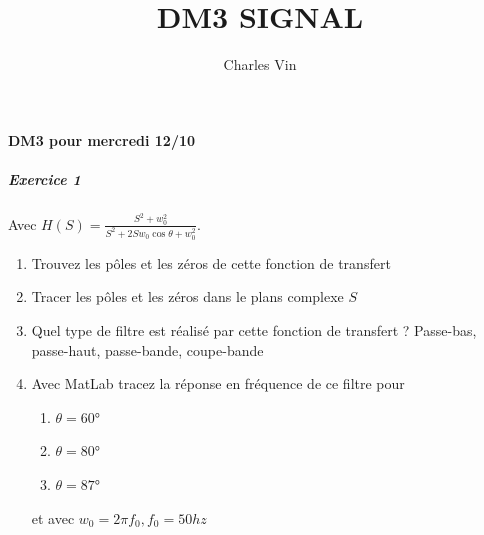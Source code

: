 \documentclass{article}
\title{DM3 SIGNAL}
\author{Charles Vin}
\theoremstyle{plain}%
\theoremstyle{definition}
\theoremstyle{remark}
\begin{document}
\maketitle

\paragraph*{DM3 pour mercredi 12/10}
\subparagraph*{Exercice 1}
Avec $ H(S) = \frac{S^2 + w_0^2}{S^2 + 2Sw_0 \cos \theta + w_0^2} $. \begin{enumerate}
    \item Trouvez les pôles et les zéros de cette fonction de transfert
    \item Tracer les pôles et les zéros dans le plans complexe $ S $ 
    \item Quel type de filtre est réalisé par cette fonction de transfert ? Passe-bas, passe-haut, passe-bande, coupe-bande
    \item Avec MatLab tracez la réponse en fréquence de ce filtre pour \begin{enumerate}
        \item $ \theta = 60 \text{°}$
        \item $ \theta = 80 \text{°}$
        \item $ \theta = 87 \text{°}$
    \end{enumerate}
    et avec $ w_0 = 2 \pi f_0, f_0 = 50hz $ 
\end{enumerate}
\end{document}
